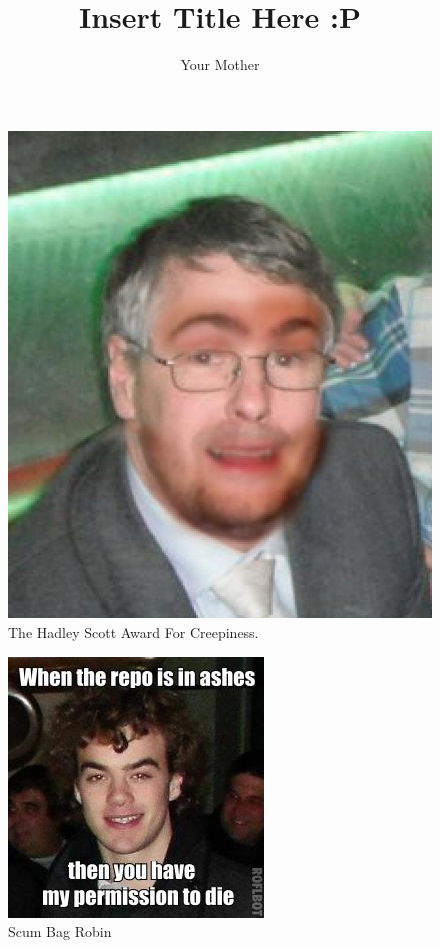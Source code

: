 \documentclass[11pt]{report}
\begin{document}
\title{Insert Title Here :P} 
\author{Your Mother}
\maketitle
\thispagestyle{empty}
\newpage


\newpage

\newpage

\newpage


\begin{figure}[h]
\begin{center}
\includegraphics[scale=0.4]{./design/542749_10151334664783073_750339761_n} 
\end{center}
\caption{The Hadley Scott Award For Creepiness.}
\label{fig:the hadley scott award for creepiness}
\end{figure} 

\begin{figure}[h]
\begin{center}
\includegraphics[scale=0.4]{./design/banerobin} 
\end{center}
\caption{Scum Bag Robin}
\label{fig:scum bag robin}
\end{figure}
\end{document}

